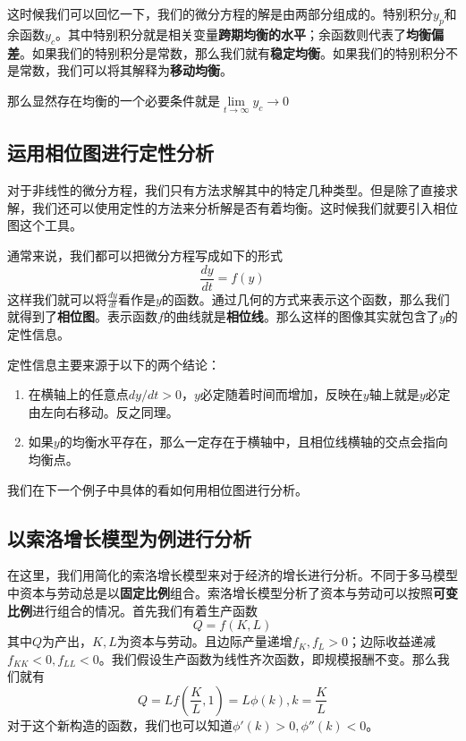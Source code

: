 \documentclass[UTF8,12pt]{ctexart}
\numberwithin{equation}{section} %
\numberwithin{figure}{section}
\numberwithin{table}{section}
\begin{document}
	这时候我们可以回忆一下，我们的微分方程的解是由两部分组成的。特别积分$y_p$和余函数$y_c$。其中特别积分就是相关变量\textbf{跨期均衡的水平}；余函数则代表了\textbf{均衡偏差}。如果我们的特别积分是常数，那么我们就有\textbf{稳定均衡}。如果我们的特别积分不是常数，我们可以将其解释为\textbf{移动均衡}。
	
	那么显然存在均衡的一个必要条件就是$\lim\limits_{t \to \infty}y_c \to 0$
	
	\subsection{运用相位图进行定性分析}
	对于非线性的微分方程，我们只有方法求解其中的特定几种类型。但是除了直接求解，我们还可以使用定性的方法来分析解是否有着均衡。这时候我们就要引入相位图这个工具。
	
	通常来说，我们都可以把微分方程写成如下的形式
	\begin{equation}
		\frac{dy}{dt} = f(y)
	\end{equation}
	这样我们就可以将$\frac{dy}{dt}$看作是$y$的函数。通过几何的方式来表示这个函数，那么我们就得到了\textbf{相位图}。表示函数$f$的曲线就是\textbf{相位线}。那么这样的图像其实就包含了$y$的定性信息。
	
	定性信息主要来源于以下的两个结论：
	\begin{enumerate}
		\item 在横轴上的任意点$dy/dt > 0$，$y$必定随着时间而增加，反映在$y$轴上就是$y$必定由左向右移动。反之同理。
		
		\item 如果$y$的均衡水平存在，那么一定存在于横轴中，且相位线横轴的交点会指向均衡点。
	\end{enumerate}

	我们在下一个例子中具体的看如何用相位图进行分析。
	
	\subsection{以索洛增长模型为例进行分析}
	在这里，我们用简化的索洛增长模型来对于经济的增长进行分析。不同于多马模型中资本与劳动总是以\textbf{固定比例}组合。索洛增长模型分析了资本与劳动可以按照\textbf{可变比例}进行组合的情况。首先我们有着生产函数
	\begin{equation}
		Q = f(K,L)
	\end{equation}
	其中$Q$为产出，$K,L$为资本与劳动。且边际产量递增$f_K,f_L > 0 $；边际收益递减$f_{KK} < 0,f_{LL} < 0$。我们假设生产函数为线性齐次函数，即规模报酬不变。那么我们就有
	\begin{equation}
		Q = Lf(\frac{K}{L},1) = L\phi(k),k = \frac{K}{L} \label{solow one}
	\end{equation}
	对于这个新构造的函数，我们也可以知道$\phi'(k) > 0,\phi''(k) < 0$。
	
\end{document}
